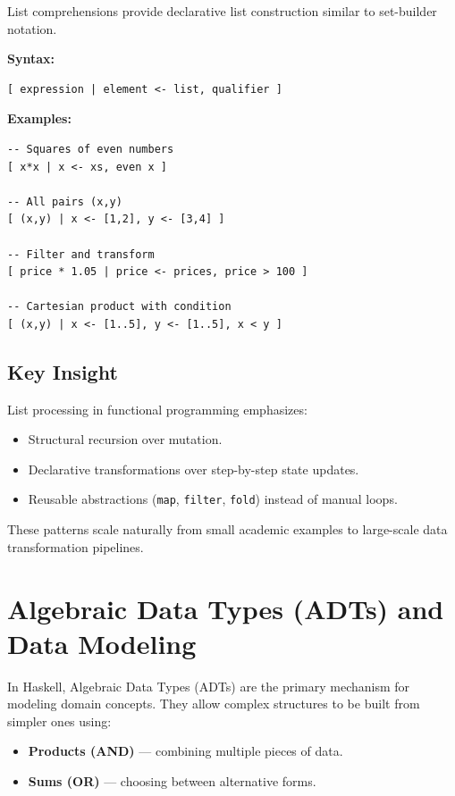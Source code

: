 \documentclass[12pt]{article}
\begin{document}
List comprehensions provide declarative list construction similar to set-builder notation.

\textbf{Syntax:}
\begin{verbatim}
[ expression | element <- list, qualifier ]
\end{verbatim}

\textbf{Examples:}

\begin{verbatim}
-- Squares of even numbers
[ x*x | x <- xs, even x ]

-- All pairs (x,y)
[ (x,y) | x <- [1,2], y <- [3,4] ]

-- Filter and transform
[ price * 1.05 | price <- prices, price > 100 ]

-- Cartesian product with condition
[ (x,y) | x <- [1..5], y <- [1..5], x < y ]
\end{verbatim}

\subsection{Key Insight}

List processing in functional programming emphasizes:

\begin{itemize}
  \item Structural recursion over mutation.
  \item Declarative transformations over step-by-step state updates.
  \item Reusable abstractions (\texttt{map}, \texttt{filter}, \texttt{fold}) instead of manual loops.
\end{itemize}

These patterns scale naturally from small academic examples to large-scale data transformation pipelines.



\section{Algebraic Data Types (ADTs) and Data Modeling}

In Haskell, Algebraic Data Types (ADTs) are the primary mechanism for modeling domain concepts. They allow complex structures to be built from simpler ones using:

\begin{itemize}
  \item \textbf{Products (AND)} — combining multiple pieces of data.
  \item \textbf{Sums (OR)} — choosing between alternative forms.
\end{itemize}
\end{document}
